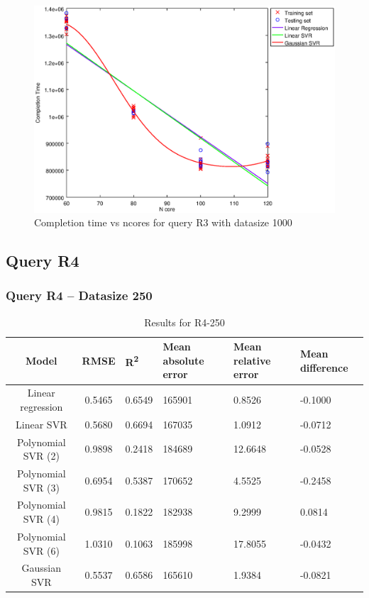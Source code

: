 \documentclass[a4paper,11pt]{article}
\begin{document}
\begin {figure}[hbtp]
\centering
\includegraphics[width=\textwidth]{output/R3_1000_ONLY_1_LINEAR_NCORE/plot_R3_1000_bestmodels.eps}
\caption{Completion time vs ncores for query R3 with datasize 1000}
\label{fig:coreonly_linear_R3_1000}
\end {figure}

\newpage
\subsection{Query R4}
\subsubsection{Query R4 -- Datasize 250}
\begin{table}[H]
	\centering
	\begin{adjustbox}{center}
		\begin{tabular}{c | c M{1.2cm} M{2.5cm} M{2.5cm} M{1.8cm}}
			Model & RMSE & R\textsuperscript{2} & Mean absolute error & Mean relative error & Mean difference \tabularnewline
			\hline
			Linear regression & 0.5465 & 0.6549 & 165901 & 0.8526 & -0.1000 \\
			Linear SVR & 0.5680 & 0.6694 & 167035 & 1.0912 & -0.0712 \\
			Polynomial SVR (2) & 0.9898 & 0.2418 & 184689 & 12.6648 & -0.0528 \\
			Polynomial SVR (3) & 0.6954 & 0.5387 & 170652 & 4.5525 & -0.2458 \\
			Polynomial SVR (4) & 0.9815 & 0.1822 & 182938 & 9.2999 & 0.0814 \\
			Polynomial SVR (6) & 1.0310 & 0.1063 & 185998 & 17.8055 & -0.0432 \\
			Gaussian SVR & 0.5537 & 0.6586 & 165610 & 1.9384 & -0.0821 \\
		\end{tabular}
	\end{adjustbox}
	\\
	\caption{Results for R4-250}
	\label{fig:coreonly_linear_R4_250}
\end{table}
\end{document}

